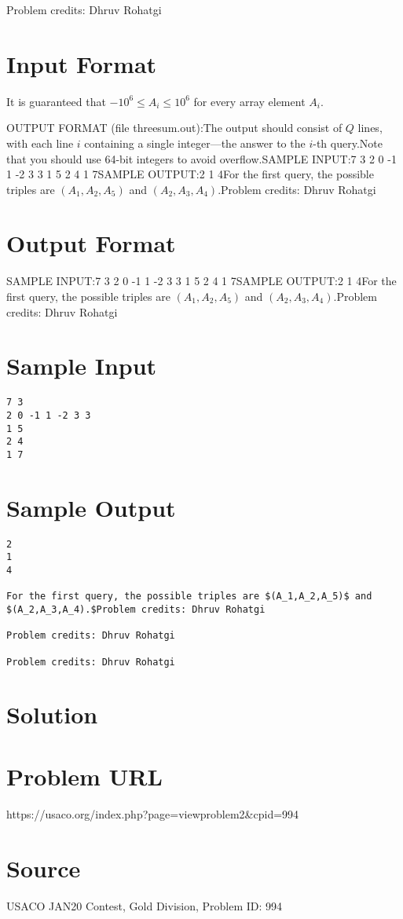 \documentclass[12pt]{article}
\begin{document}
Problem credits: Dhruv Rohatgi



\section*{Input Format}
It is guaranteed that $-10^6 \leq A_i \leq 10^6$ for every array element $A_i$.

OUTPUT FORMAT (file threesum.out):The output should consist of $Q$ lines, with each line $i$ containing a single
integer---the answer to the $i$-th query.Note that you should use 64-bit
integers to avoid overflow.SAMPLE INPUT:7 3
2 0 -1 1 -2 3 3
1 5
2 4
1 7SAMPLE OUTPUT:2
1
4For the first query, the possible triples are $(A_1,A_2,A_5)$ and
$(A_2,A_3,A_4).$Problem credits: Dhruv Rohatgi

\section*{Output Format}
SAMPLE INPUT:7 3
2 0 -1 1 -2 3 3
1 5
2 4
1 7SAMPLE OUTPUT:2
1
4For the first query, the possible triples are $(A_1,A_2,A_5)$ and
$(A_2,A_3,A_4).$Problem credits: Dhruv Rohatgi

\section*{Sample Input}
\begin{verbatim}
7 3
2 0 -1 1 -2 3 3
1 5
2 4
1 7
\end{verbatim}

\section*{Sample Output}
\begin{verbatim}
2
1
4

For the first query, the possible triples are $(A_1,A_2,A_5)$ and
$(A_2,A_3,A_4).$Problem credits: Dhruv Rohatgi

Problem credits: Dhruv Rohatgi

Problem credits: Dhruv Rohatgi
\end{verbatim}

\section*{Solution}


\section*{Problem URL}
https://usaco.org/index.php?page=viewproblem2&cpid=994

\section*{Source}
USACO JAN20 Contest, Gold Division, Problem ID: 994
\end{document}
